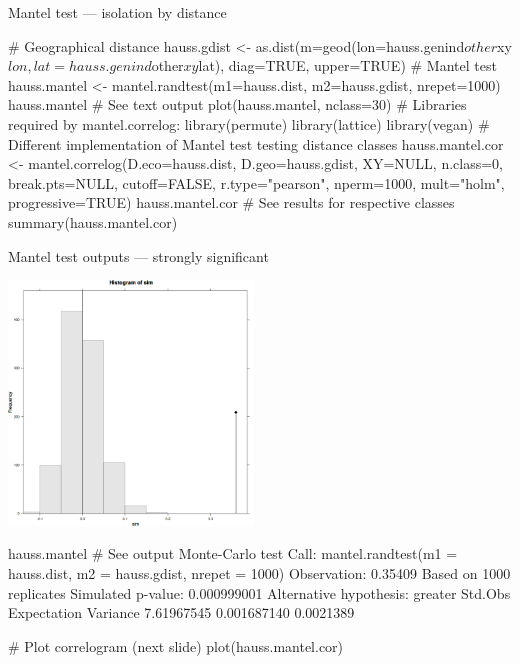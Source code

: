 \documentclass[compress, xelatex, 11pt, xcolor=svgnames, aspectratio=169,
	hyperref={
		bookmarks=true,
		unicode=true,
		colorlinks=true,
		pdftitle={Molecular data in R},
		plainpages=false,
		pdfauthor={Vojtech Zeisek},
		pdfsubject={Course about phylogeny and evolution in R},
		pdfcreator={XeLaTeX},
		pdfkeywords={R, evolution, phylogeny, molecular data},
		linkcolor=Crimson, %
		anchorcolor=Magenta, %
		citecolor=Magenta, %
		filecolor=Magenta, %
		menucolor=Magenta, %
		urlcolor=DodgerBlue, %
		},
	url={hyphens, lowtilde} %
	]{beamer}
\begin{document}
\begin{frame}[fragile]{Mantel test --- isolation by distance}
	\begin{spluscode}
    # Geographical distance
    hauss.gdist <- as.dist(m=geod(lon=hauss.genind$other$xy$lon,
      lat=hauss.genind$other$xy$lat), diag=TRUE, upper=TRUE)
    # Mantel test
    hauss.mantel <- mantel.randtest(m1=hauss.dist, m2=hauss.gdist, nrepet=1000)
    hauss.mantel # See text output
    plot(hauss.mantel, nclass=30)
    # Libraries required by mantel.correlog:
    library(permute)
    library(lattice)
    library(vegan)
    # Different implementation of Mantel test testing distance classes
    hauss.mantel.cor <- mantel.correlog(D.eco=hauss.dist, D.geo=hauss.gdist,
      XY=NULL, n.class=0, break.pts=NULL, cutoff=FALSE, r.type="pearson",
      nperm=1000, mult="holm", progressive=TRUE)
    hauss.mantel.cor # See results for respective classes
    summary(hauss.mantel.cor)
	\end{spluscode}
\end{frame}

\begin{frame}[fragile]{Mantel test outputs --- strongly significant}
	\begin{multicols}{2}
		\begin{center}
			\includegraphics[height=6.5cm]{mantel.png}
		\end{center}
		\columnbreak
		\begin{spluscode}
    hauss.mantel # See output
    Monte-Carlo test
    Call: mantel.randtest(m1 =
      hauss.dist, m2 =
      hauss.gdist, nrepet = 1000)
    Observation: 0.35409
    Based on 1000 replicates
    Simulated p-value: 0.000999001
    Alternative hypothesis: greater
      Std.Obs Expectation  Variance
    7.61967545 0.001687140 0.0021389
		\end{spluscode}
		\vfill
		\begin{spluscode}
    # Plot correlogram (next slide)
    plot(hauss.mantel.cor)
		\end{spluscode}
		\vfill
	\end{multicols}
\end{frame}
\end{document}
